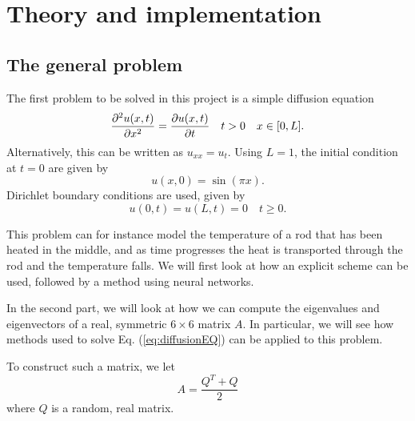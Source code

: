 \section{Theory and implementation}
\label{sec:theory}

\subsection{The general problem}

The first problem to be solved in this project is a simple diffusion equation
\begin{equation}
\pdv[2]{u(x,t)}{x} = \pdv{u(x,t)}{t} \quad t>0 \quad x\in [0,L].
    \label{eq:diffusionEQ}
\end{equation}
Alternatively, this can be written as $u_{xx} = u_t$. Using $L=1$, the initial condition at $t=0$ are given by
\begin{equation}
    u(x,0) = \sin(\pi x)
    \label{eq:initialCondition}.
\end{equation}
Dirichlet boundary conditions are used, given by
\begin{equation*}
    u(0,t) = u(L,t) = 0 \quad t \geq 0.
\end{equation*}

This problem can for instance model the temperature of a rod that has been heated in the middle,
and as time progresses the heat is transported through the rod and the temperature falls. We will first look at how an explicit scheme can be used, followed by a method using neural networks.

In the second part, we will look at how we can compute the eigenvalues and eigenvectors of a real, symmetric $6\times 6$ matrix $A$. In particular, we will see how methods used to solve Eq. (\ref{eq:diffusionEQ}) can be applied to this problem.

To construct such a matrix, we let
\begin{equation*}
	A = \frac{Q^T+Q }{2}
\end{equation*}
where $Q$ is a random, real matrix.

